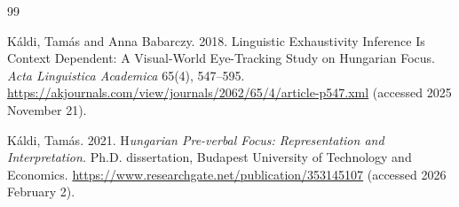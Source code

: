\documentclass[ruler]{CUP-JNL-LIN}%
\begin{document}
\begin{Backmatter}
\begin{thebibliography}{99}

{Káldi, Tamás and Anna Babarczy}. 2018. Linguistic Exhaustivity Inference Is Context Dependent: A Visual-World Eye-Tracking Study on Hungarian Focus. \textit{Acta Linguistica Academica} 65(4), 547--595. \url{https://akjournals.com/view/journals/2062/65/4/article-p547.xml} (accessed 2025 November 21).




{Káldi, Tamás}. 2021. H\textit{ungarian Pre-verbal Focus: Representation and Interpretation.} Ph.D. dissertation, Budapest University of Technology and Economics. \url{https://www.researchgate.net/publication/353145107}  (accessed 2026 February 2).



\end{thebibliography}
\end{Backmatter}
\end{document}
